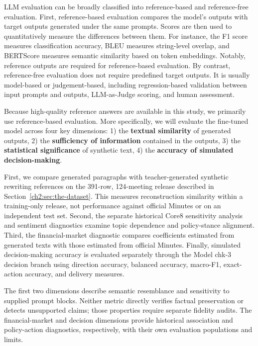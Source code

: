 LLM evaluation can be broadly classified into reference-based and reference-free evaluation. First, reference-based evaluation compares the model’s outputs with target outputs generated under the same prompts. Scores are then used to quantitatively measure the differences between them. For instance, the F1 score measures classification accuracy, BLEU \cite{papineni2002bleu} measures string-level overlap, and BERTScore \cite{zhang2019bertscore} measures semantic similarity based on token embeddings. Notably, reference outputs are required for reference-based evaluation. By contrast, reference-free evaluation does not require predefined target outputs. It is usually model-based or judgement-based, including regression-based validation between input prompts and outputs, LLM-as-Judge scoring, and human assessment.


Because high-quality reference answers are available in this study, we primarily use reference-based evaluation. More specifically, we will evaluate the fine-tuned model across four key dimensions:  1) the \textbf{textual similarity} of generated outputs, 2) the \textbf{sufficiency of information} contained in the outputs, 3) the \textbf{statistical significance} of synthetic text, 4) the \textbf{accuracy of simulated decision-making}. 

First, we compare generated paragraphs with teacher-generated synthetic rewriting references on the 391-row, 124-meeting release described in Section~\ref{ch2:sec:the-dataset}. This measures reconstruction similarity within a training-only release, not performance against official Minutes or on an independent test set. Second, the separate historical Core8 sensitivity analysis and sentiment diagnostics examine topic dependence and policy-stance alignment. Third, the financial-market diagnostic compares coefficients estimated from generated texts with those estimated from official Minutes. Finally, simulated decision-making accuracy is evaluated separately through the Model chk-3 decision branch using direction accuracy, balanced accuracy, macro-F1, exact-action accuracy, and delivery measures.


The first two dimensions describe semantic resemblance and sensitivity to
supplied prompt blocks. Neither metric directly verifies factual preservation
or detects unsupported claims; those properties require separate fidelity
audits. The financial-market and decision dimensions provide historical
association and policy-action diagnostics, respectively, with their own
evaluation populations and limits.




